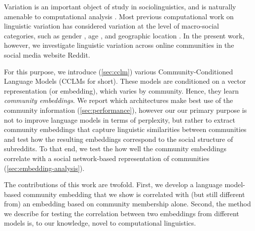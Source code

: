 \documentclass[11pt]{article}
\begin{document}
Variation is an important object of study in sociolinguistics,
and is naturally amenable to computational analysis \citep{Nguyen2016}.
Most previous computational work on linguistic variation 
has considered variation at the level of macro-social categories, such as gender
\citep{Burger2011,Ciot2013,Bamman2014}, age \citep{Nguyen2013}, and
geographic location \citep{Eisenstein2010,Bamman2014a}.%
In the present work, however, we investigate linguistic variation
across online communities in the social media website Reddit. 

%  
%
%

For this purpose, we introduce (\cref{sec:cclm}) various
Community-Conditioned Language Models (CCLMs for short). These models
are conditioned on a vector representation (or embedding), which
varies by community. Hence, they learn \emph{community
  embeddings}.  
We report which architectures make best use
of the community information (\cref{sec:performance}), 
however our our primary purpose is not to improve language models in
terms of perplexity, but rather to extract 
community embeddings that capture linguistic similarities between
communities and test how the resulting embeddings
correspond to the social structure of subreddits. To that end, we test
the how well the community embeddings correlate with a social network-based representation of
communities (\cref{sec:embedding-analysis}).

The contributions of this work are twofold. 
First, we develop a language model-based
community embedding that we show is correlated with (but still different from) 
an embedding based on community membership alone.
Second, the method we describe for testing the correlation between two embeddings
from different models is, to our knowledge, novel to computational linguistics.
\end{document}
